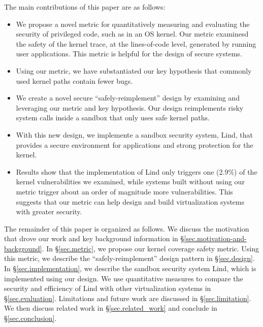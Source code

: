 The main contributions of this paper are as follows: %
\begin{itemize}
\item We propose a novel metric for quantitatively measuring and evaluating the
security of privileged code, such as in an OS kernel. Our metric examinesd
the safety of the kernel trace, at the lines-of-code level, generated by
running user applications. This metric is helpful for the design of secure systems.
\item Using our metric, we have substantiated our key hypothesis that commonly
used kernel paths contain fewer bugs. 
\item We create a novel secure ``safely-reimplement'' design by examining and
leveraging our metric and key hypothesis. 
Our design reimplements risky system calls inside a
sandbox that only uses safe kernel paths. 
\item With this new design, we implemente a sandbox security system, Lind, that
provides a secure environment for applications and strong protection for
the kernel.
\item Results show that the implementation of Lind only triggers one (2.9\%) of
the kernel vulnerabilities we examined, while systems built without using
our metric trigger about an order of magnitude more vulnerabilities. This
suggests that our metric can help design and build virtualization systems
with greater security. 
\end{itemize}


The remainder of this paper is organized as follows. 
We discuss the motivation that drove our work and key background information 
in \S{\ref{sec.motivation-and-background}}. 
In \S{\ref{sec.metric}}, we propose our kernel coverage safety metric. 
Using this metric, we describe the 
``safely-reimplement'' design pattern in \S{\ref{sec.design}}. In 
\S{\ref{sec.implementation}}, we describe the sandbox security 
system Lind, which is implemented using our design. We use quantitative 
measures to compare the security and efficiency of Lind with other 
virtualization systems in \S{\ref{sec.evaluation}}. 
Limitations and future work are discussed in \S{\ref{sec.limitation}}.  
We then discuss related work in \S{\ref{sec.related_work}} and conclude
in \S{\ref{sec.conclusion}}.

